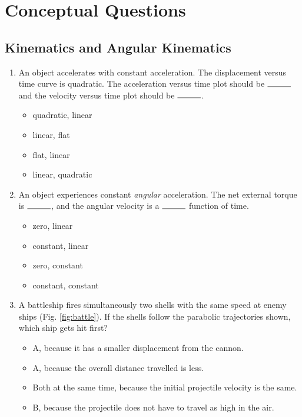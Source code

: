 \documentclass[10pt]{article}
\begin{document}
\maketitle

\section{Conceptual Questions}
\subsection{Kinematics and Angular Kinematics}
\begin{enumerate}
\item An object accelerates with constant acceleration.  The displacement versus time curve is quadratic.  The acceleration versus time plot should be $\rule{1cm}{0.15mm}$ and the velocity versus time plot should be $\rule{1cm}{0.15mm}$.
\begin{itemize}
\item quadratic, linear
\item linear, flat
\item flat, linear
\item linear, quadratic
\end{itemize}
\item An object experiences constant \textit{angular} acceleration.  The net external torque is $\rule{1cm}{0.15mm}$, and the angular velocity is a $\rule{1cm}{0.15mm}$ function of time.
\begin{itemize}
\item zero, linear
\item constant, linear
\item zero, constant
\item constant, constant
\end{itemize}
\item A battleship fires simultaneously two shells with the same speed at enemy ships (Fig. \ref{fig:battle}).  If the shells follow the parabolic trajectories shown, which ship gets hit first?
\begin{itemize}
\item A, because it has a smaller displacement from the cannon.
\item A, because the overall distance travelled is less.
\item Both at the same time, because the initial projectile velocity is the same.
\item B, because the projectile does not have to travel as high in the air.

\end{itemize}
\end{enumerate}
\end{document}
